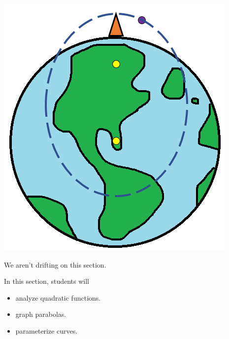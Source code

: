 \documentclass{ximera}
\begin{document}
\begin{center}
\includegraphics{Earth-Gravity.png}
\end{center}






We aren't drifting on this section.





















\begin{sectionOutcomes}
In this section, students will 

\begin{itemize}
\item analyze quadratic functions.
\item graph parabolas.
\item parameterize curves.
\end{itemize}
\end{sectionOutcomes}
\end{document}
